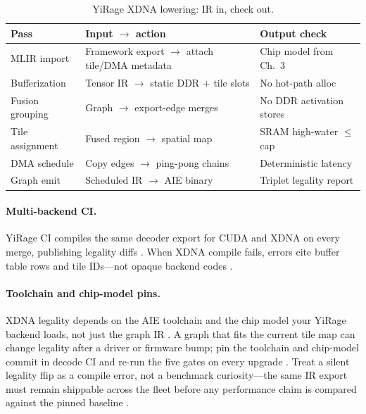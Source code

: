 \begin{table}[t]
\centering
\small
\caption{YiRage XDNA lowering: IR in, check out.}
\label{tab:yirage_xdna_lowering}
\begin{tabular}{@{}p{2.1cm}p{3.2cm}p{3.8cm}@{}}
\toprule
\textbf{Pass} & \textbf{Input $\rightarrow$ action} & \textbf{Output check} \\
\midrule
MLIR import & Framework export $\rightarrow$ attach tile/DMA metadata & Chip model from Ch.~3 \\
Bufferization & Tensor IR $\rightarrow$ static DDR + tile slots & No hot-path alloc \\
Fusion grouping & Graph $\rightarrow$ export-edge merges & No DDR activation stores \\
Tile assignment & Fused region $\rightarrow$ spatial map & SRAM high-water $\le$ cap \\
DMA schedule & Copy edges $\rightarrow$ ping-pong chains & Deterministic latency \\
Graph emit & Scheduled IR $\rightarrow$ AIE binary & Triplet legality report \\
\bottomrule
\end{tabular}
\end{table}

\paragraph{Multi-backend CI.}
YiRage CI compiles the same decoder export for CUDA and XDNA on every merge, publishing legality diffs \citep{yirage2026,chen2020compilerbasedhardw}.
When XDNA compile fails, errors cite buffer table rows and tile IDs---not opaque backend codes \citep{amd2024aie,patel2025llminference}.

\paragraph{Toolchain and chip-model pins.}
XDNA legality depends on the AIE toolchain and the chip model your YiRage backend loads, not just the graph IR \citep{amd2024aie,yirage2026}.
A graph that fits the current tile map can change legality after a driver or firmware bump; pin the toolchain and chip-model commit in decode CI and re-run the five gates on every upgrade \citep{amd2024xdna,patel2025llminference}.
Treat a silent legality flip as a compile error, not a benchmark curiosity---the same IR export must remain shippable across the fleet before any performance claim is compared against the pinned baseline \citep{yirage2026,amd2024aie}.

